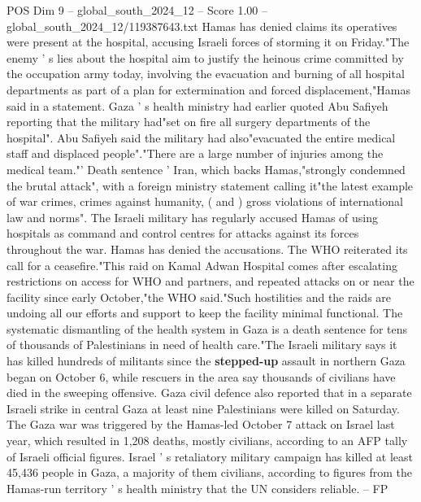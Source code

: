 \begin{textsample}{POS Dim 9 – global\_south\_2024\_12 – Score 1.00 – global\_south\_2024\_12/119387643.txt}
Hamas has denied claims its operatives were present at the hospital, accusing Israeli forces of storming it on Friday."The enemy ' s lies about the hospital aim to justify the heinous crime committed by the occupation army today, involving the evacuation and burning of all hospital departments as part of a plan for extermination and forced displacement,"Hamas said in a statement.
Gaza ' s health ministry had earlier quoted Abu Safiyeh reporting that the military had"set on fire all surgery departments of the hospital".
Abu Safiyeh said the military had also"evacuated the entire medical staff and displaced people"."There are a large number of injuries among the medical team."' Death sentence ' Iran, which backs Hamas,"strongly condemned the brutal attack", with a foreign ministry statement calling it"the latest example of war crimes, crimes against humanity, ( and ) gross violations of international law and norms".
The Israeli military has regularly accused Hamas of using hospitals as command and control centres for attacks against its forces throughout the war.
Hamas has denied the accusations.
The WHO reiterated its call for a ceasefire."This raid on Kamal Adwan Hospital comes after escalating restrictions on access for WHO and partners, and repeated attacks on or near the facility since early October,"the WHO said."Such hostilities and the raids are undoing all our efforts and support to keep the facility minimal functional.
The systematic dismantling of the health system in Gaza is a death sentence for tens of thousands of Palestinians in need of health care."The Israeli military says it has killed hundreds of militants since the \textbf{stepped-up} assault in northern Gaza began on October 6, while rescuers in the area say thousands of civilians have died in the sweeping offensive.
Gaza civil defence also reported that in a separate Israeli strike in central Gaza at least nine Palestinians were killed on Saturday.
The Gaza war was triggered by the Hamas-led October 7 attack on Israel last year, which resulted in 1,208 deaths, mostly civilians, according to an AFP tally of Israeli official figures.
Israel ' s retaliatory military campaign has killed at least 45,436 people in Gaza, a majority of them civilians, according to figures from the Hamas-run territory ' s health ministry that the UN considers reliable. -- FP

\end{textsample}
